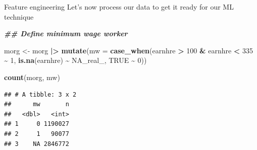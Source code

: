 \documentclass[
  ignorenonframetext,
]{beamer}
\newenvironment{Shaded}{\begin{snugshade}}{\end{snugshade}}
\newcommand{\AttributeTok}[1]{\textcolor[rgb]{0.13,0.29,0.53}{#1}}
\newcommand{\ConstantTok}[1]{\textcolor[rgb]{0.56,0.35,0.01}{#1}}
\newcommand{\DecValTok}[1]{\textcolor[rgb]{0.00,0.00,0.81}{#1}}
\newcommand{\DocumentationTok}[1]{\textcolor[rgb]{0.56,0.35,0.01}{\textbf{\textit{#1}}}}
\newcommand{\FunctionTok}[1]{\textcolor[rgb]{0.13,0.29,0.53}{\textbf{#1}}}
\newcommand{\NormalTok}[1]{#1}
\newcommand{\OtherTok}[1]{\textcolor[rgb]{0.56,0.35,0.01}{#1}}
\newcommand{\SpecialCharTok}[1]{\textcolor[rgb]{0.81,0.36,0.00}{\textbf{#1}}}
\begin{document}
\begin{frame}[fragile]{Feature engineering}
\label{feature-engineering}
Let's now process our data to get it ready for our ML technique

\tiny

\begin{Shaded}
\begin{Highlighting}[]
\DocumentationTok{\#\# Define minimum wage worker}

\NormalTok{morg }\OtherTok{\textless{}{-}}\NormalTok{ morg }\SpecialCharTok{|\textgreater{}}
  \FunctionTok{mutate}\NormalTok{(}\AttributeTok{mw =} \FunctionTok{case\_when}\NormalTok{(earnhre }\SpecialCharTok{\textgreater{}} \DecValTok{100} \SpecialCharTok{\&}\NormalTok{ earnhre }\SpecialCharTok{\textless{}} \DecValTok{335} \SpecialCharTok{\textasciitilde{}} \DecValTok{1}\NormalTok{,}
                        \FunctionTok{is.na}\NormalTok{(earnhre) }\SpecialCharTok{\textasciitilde{}} \ConstantTok{NA\_real\_}\NormalTok{,}
                        \ConstantTok{TRUE} \SpecialCharTok{\textasciitilde{}} \DecValTok{0}\NormalTok{))}

\FunctionTok{count}\NormalTok{(morg, mw)}
\end{Highlighting}
\end{Shaded}

\begin{verbatim}
## # A tibble: 3 x 2
##      mw       n
##   <dbl>   <int>
## 1     0 1190027
## 2     1   90077
## 3    NA 2846772
\end{verbatim}
\end{frame}
\end{document}
